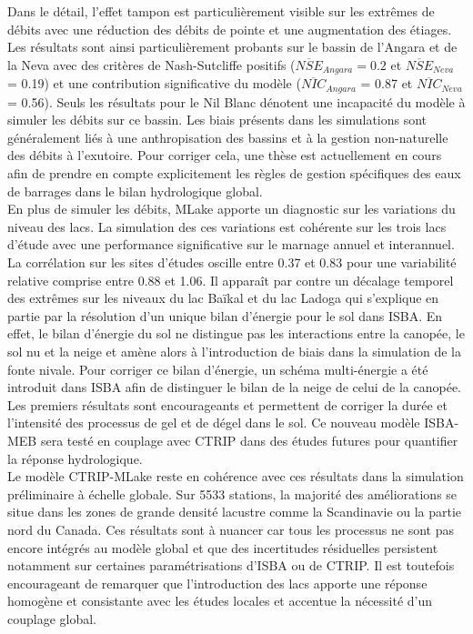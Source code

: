 Dans le détail, l'effet tampon est particulièrement visible sur les extrêmes de débits avec une réduction des débits de pointe et une augmentation des étiages. Les résultats sont ainsi particulièrement probants sur le bassin de l'Angara et de la Neva avec des critères de Nash-Sutcliffe positifs ($\overline{NSE}_{Angara}=0.2$ et $\overline{NSE}_{Neva}$ = 0.19) et une contribution significative du modèle ($\overline{NIC}_{Angara}$ = 0.87 et $\overline{NIC}_{Neva}$ = 0.56). Seuls les résultats pour le Nil Blanc dénotent une incapacité du modèle à simuler les débits sur ce bassin. Les biais présents dans les simulations sont généralement liés à une anthropisation des bassins et à la gestion non-naturelle des débits à l'exutoire. Pour corriger cela, une thèse est actuellement en cours afin de prendre en compte explicitement les règles de gestion spécifiques des eaux de barrages dans le bilan hydrologique global.\\

En plus de simuler les débits, MLake apporte un diagnostic sur les variations du niveau des lacs. La simulation des ces variations est cohérente sur les trois lacs d'étude avec une performance significative sur le marnage annuel et interannuel. La corrélation sur les sites d'études oscille entre 0.37 et 0.83 pour une variabilité relative comprise entre 0.88 et 1.06. Il apparaît par contre un décalage temporel des extrêmes sur les niveaux du lac Baïkal et du lac Ladoga qui s'explique en partie par la résolution d'un unique bilan d'énergie pour le sol dans ISBA. En effet, le bilan d'énergie du sol ne distingue pas les interactions entre la canopée, le sol nu et la neige et amène alors à l'introduction de biais dans la simulation de la fonte nivale. Pour corriger ce bilan d'énergie, un schéma multi-énergie a été introduit dans ISBA afin de distinguer le bilan de la neige de celui de la canopée. Les premiers résultats sont encourageants et permettent de corriger la durée et l'intensité des processus de gel et de dégel dans le sol. Ce nouveau modèle ISBA-MEB sera testé en couplage avec CTRIP dans des études futures pour quantifier la réponse hydrologique.\\

Le modèle CTRIP-MLake reste en cohérence avec ces résultats dans la simulation préliminaire à échelle globale. Sur 5533 stations, la majorité des améliorations se situe dans les zones de grande densité lacustre comme la Scandinavie ou la partie nord du Canada. Ces résultats sont à nuancer car tous les processus ne sont pas encore intégrés au modèle global et que des incertitudes résiduelles persistent notamment sur certaines paramétrisations d'ISBA ou de CTRIP. Il est toutefois encourageant de remarquer que l'introduction des lacs apporte une réponse homogène et consistante avec les études locales et accentue la nécessité d'un couplage global.\\

